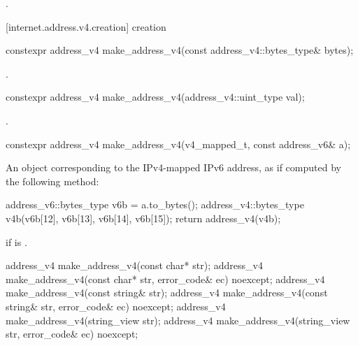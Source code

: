 \begin{itemdescr}
\pnum
\returns {}.
\end{itemdescr}



%
[internet.address.v4.creation]{ creation}

\begin{itemdecl}
constexpr address_v4 make_address_v4(const address_v4::bytes_type& bytes);
\end{itemdecl}

\begin{itemdescr}
\pnum
\returns {}.
\end{itemdescr}

\begin{itemdecl}
constexpr address_v4 make_address_v4(address_v4::uint_type val);
\end{itemdecl}

\begin{itemdescr}
\pnum
\returns {}.
\end{itemdescr}

\begin{itemdecl}
constexpr address_v4 make_address_v4(v4_mapped_t, const address_v6& a);
\end{itemdecl}

\begin{itemdescr}
\pnum
\returns An  object corresponding to the IPv4-mapped IPv6 address, as if computed by the following method: 
\begin{codeblock}
address_v6::bytes_type v6b = a.to_bytes();
address_v4::bytes_type v4b(v6b[12], v6b[13], v6b[14], v6b[15]);
return address_v4(v4b);
\end{codeblock}


\pnum
\remarks {} if  is .
\end{itemdescr}

\begin{itemdecl}
address_v4 make_address_v4(const char* str);
address_v4 make_address_v4(const char* str, error_code& ec) noexcept;
address_v4 make_address_v4(const string& str);
address_v4 make_address_v4(const string& str, error_code& ec) noexcept;
address_v4 make_address_v4(string_view str);
address_v4 make_address_v4(string_view str, error_code& ec) noexcept;
\end{itemdecl}

